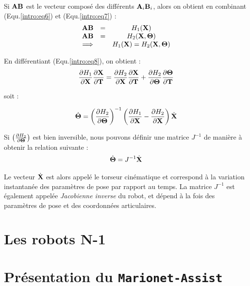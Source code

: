 Si ${\bf AB}$ est le vecteur composé des différents ${\bf A}_i{\bf B}_i$, alors 
on obtient en combinant (Equ.\ref{intro:eq6}) et (Equ.\ref{intro:eq7}) :
\begin{equation}
\begin{matrix}
{\bf AB} &=& H_1({\bf X}) \\
{\bf AB} &=& H_2({\bf X}, {\bf \Theta}) \\
\Longrightarrow & & H_1({\bf X}) = H_2({\bf X}, {\bf \Theta})
\end{matrix}
\label{intro:eq8}
\end{equation}

En différentiant (Equ.\ref{intro:eq8}), on obtient :
\begin{equation}
\frac{\partial H_1}{\partial {\bf X}} \frac{\partial {\bf X}}{\partial {\bf T}} 
=  \frac{\partial H_2}{\partial {\bf X}} \frac{\partial {\bf X}}{\partial {\bf 
T}} + \frac{\partial H_2}{\partial {\bf \Theta}} \frac{\partial {\bf 
\Theta}}{\partial {\bf T}}
\label{intro:eq9}
\end{equation}

soit :

\begin{equation}
\dot {\bf \Theta} = \left ( \frac{\partial H_2}{\partial {\bf \Theta}} \right 
)^{-1} \left (\frac{\partial H_1}{\partial {\bf X}} - \frac{\partial 
H_2}{\partial {\bf X}} \right ) \dot {\bf X}
\label{intro:eq10}
\end{equation}

Si $\left ( \frac{\partial H_2}{\partial {\bf \Theta}} \right )$ est bien 
inversible, nous pouvons définir une matrice $J^{-1}$ de manière à obtenir la 
relation suivante :
\begin{equation}
\dot {\bf \Theta} = J^{-1} \dot {\bf X}
\label{intro:eq11}
\end{equation}

Le vecteur $\dot {\bf X}$ est alors appelé le torseur cinématique et correspond 
à la variation instantanée des paramètres de pose par rapport au temps. La 
matrice $J^{-1}$  est également appelée {\it Jacobienne inverse} du robot, et 
dépend à la fois des paramètres de pose et des coordonnées articulaires.


\section{Les robots N-1} \label{chap0-2}

\section{Présentation du {\tt Marionet-Assist}} \label{chap0-3}

